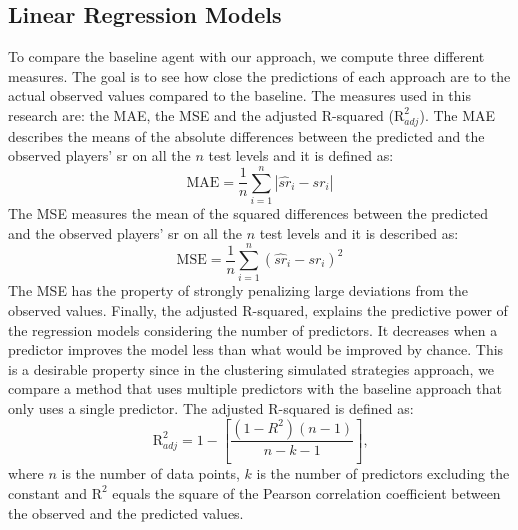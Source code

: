 \subsection{Linear Regression Models}
To compare the baseline agent with our approach, we compute three different measures. The goal is to see how close the predictions of each approach are to the actual observed values compared to the baseline. The measures used in this research are: the \acf{MAE}, the \acf{MSE} and the adjusted R-squared ($\text{R}^2_{adj}$).
The \acs{MAE} describes the means of the absolute differences between the predicted and the observed players' \acs{sr} on all the $n$ test levels and it is defined as:
\begin{equation}
    \text{MAE} = \frac{1}{n} \sum_{i=1}^{n} |\widehat{sr}_i - {sr}_i| 
\end{equation}
The \acs{MSE} measures the mean of the squared differences between the predicted and the observed players' \acs{sr} on all the $n$ test levels and it is described as:
\begin{equation}
    \text{MSE} = \frac{1}{n} \sum_{i=1}^{n} (\widehat{sr}_i - {sr}_i)^2
\end{equation}
The \acs{MSE} has the property of strongly penalizing large deviations from the observed values.
Finally, the adjusted R-squared, explains the predictive power of the regression models considering the number of predictors. It decreases when a predictor improves the model less than what would be improved by chance. This is a desirable property since in the clustering simulated strategies approach, we compare a method that uses multiple predictors with the baseline approach that only uses a single predictor. The adjusted R-squared is defined as:
\begin{equation}
    \text{R}^2_{adj} = 1 - [\frac{(1-R^2)(n-1)}{n-k-1}] \text{,}
\end{equation}
where $n$ is the number of data points, $k$ is the number of predictors excluding the constant and $\text{R}^2$ equals the square of the Pearson correlation coefficient \cite{benesty_pearson_2009} between the observed and the predicted values.
